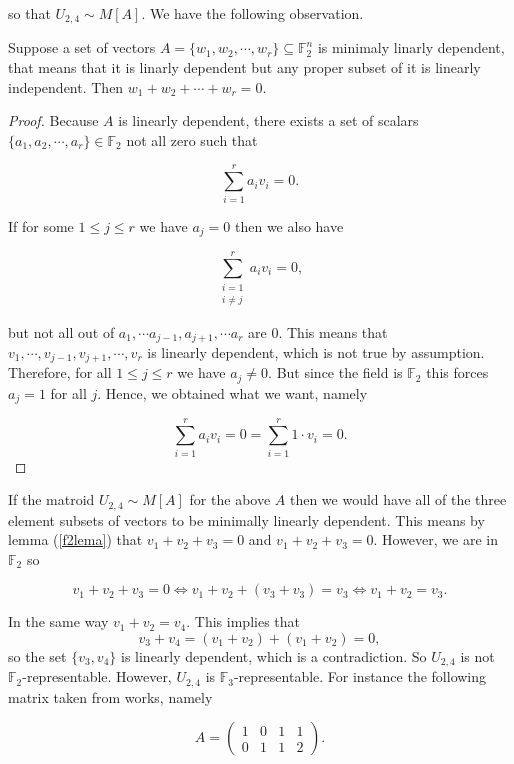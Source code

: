 so that $U_{2,4} \sim M[A]$. We have the following observation.

\begin{lemma}
\label{f2lema}
    Suppose a set of vectors $A = \{w_1, w_2, \cdots, w_r\} \subseteq \mathbb{F}_2^n$ is minimaly linarly dependent, that means that it is linarly dependent but any proper subset of it is linearly independent. Then $w_1 + w_2 + \cdots + w_r = 0$.
\end{lemma}

\begin{proof}
    Because $A$ is linearly dependent, there exists a set of scalars $\{a_1, a_2, \cdots, a_r\}\in \mathbb{F}_2$ not all zero such that
    
    $$\sum_{i=1}^r a_iv_i = 0.$$
    
    If for some $1\leq j \leq r$ we have $a_j = 0$ then we also have 
    
    $$\sum\limits_{\substack{i = 1 \\ i \neq j}} ^r a_iv_i = 0,$$

    but not all out of $a_1, \cdots a_{j-1}, a_{j+1}, \cdots a_r$ are 0. This means that ${v_1, \cdots, v_{j-1}, v_{j+1}, \cdots, v_r}$ is linearly dependent, which is not true by assumption. Therefore, for all $1\leq j \leq r$ we have $a_j \neq 0$. But since the field is $\mathbb{F}_2$ this forces $a_j = 1$ for all $j$. Hence, we obtained what we want, namely

     $$\sum_{i=1}^r a_iv_i = 0 =  \sum_{i=1}^r 1 \cdot v_i = 0.$$
    
\end{proof}

If the matroid $U_{2,4} \sim M[A]$ for the above $A$ then we would have all of the three element subsets of vectors to be minimally linearly dependent. This means by lemma (\ref{f2lema}) that $v_1 + v_2 + v_3 = 0$ and $v_1 + v_2 + v_3 = 0$. However, we are in $\mathbb{F}_2$ so 


$$v_1 + v_2 + v_3 = 0 \iff v_1 + v_2 + (v_3 + v_3) = v_3 \iff v_1 + v_2 = v_3 .$$

In the same way $v_1 + v_2 = v_4$. This implies that
$$v_3 + v_4 = (v_1 + v_2 )+ (v_1 + v_2) = 0,$$
so the set $\{v_3, v_4\}$ is linearly dependent, which is a contradiction. So $U_{2,4}$ is not $\mathbb{F}_2$-representable. However, $U_{2,4}$ is $\mathbb{F}_3$-representable. For instance the following matrix taken from \cite[p. 20]{oxley1} works, namely

$$A = \begin{pmatrix}
    1 & 0 & 1 & 1 \\
    0 & 1 & 1 & 2
\end{pmatrix}.$$

